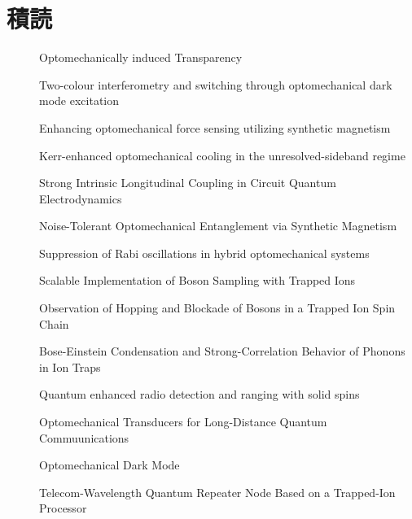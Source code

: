 \documentclass{report}
\begin{document}
    \chapter{積読}
      \begin{description}
        \item[\cite{science.1195596}] Optomechanically induced Transparency
        \item[\cite{lake2020two}] Two-colour interferometry and switching through optomechanical dark mode excitation
        \item[\cite{PhysRevA.111.053508}] Enhancing optomechanical force sensing utilizing synthetic magnetism
        \item[\cite{PhysRevA.111.053505}] Kerr-enhanced optomechanical cooling in the unresolved-sideband regime
        \item[\cite{PhysRevLett.134.153603}] Strong Intrinsic Longitudinal Coupling in Circuit Quantum Electrodynamics
        \item[\cite{PhysRevLett.129.063602}] Noise-Tolerant Optomechanical Entanglement via Synthetic Magnetism
        \item[\cite{PhysRevA.92.043822}] Suppression of Rabi oscillations in hybrid optomechanical systems
        \item[\cite{PhysRevLett.112.050504}] Scalable Implementation of Boson Sampling with Trapped Ions
        \item[\cite{PhysRevLett.120.073001}] Observation of Hopping and Blockade of Bosons in a Trapped Ion Spin Chain
        \item[\cite{PhysRevLett.93.263602}] Bose-Einstein Condensation and Strong-Correlation Behavior of Phonons in Ion Traps
        \item[\cite{chen2023quantum}] Quantum enhanced radio detection and ranging with solid spins
        \item[\cite{PhysRevLett.105.220501}] Optomechanical Transducers for Long-Distance Quantum Commuunications
        \item[\cite{science.1228370}] Optomechanical Dark Mode
        \item[\cite{PhysRevLett.130.213601}] Telecom-Wavelength Quantum Repeater Node Based on a Trapped-Ion Processor
      \end{description}
  \printbibliography
\end{document}
